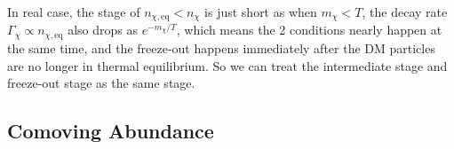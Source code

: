 \bigskip \noindent
\begin{remark}
    In real case, the stage of $n_{\chi,\mathrm{eq}} < n_\chi$ is just short as when $m_\chi < T$, the decay rate $\Gamma_\chi \propto n_{\chi,\mathrm{eq}}$ also drops as $e^{-m_\chi/T}$, which means the 2 conditions nearly happen at the same time, and the freeze-out happens immediately after the DM particles are no longer in thermal equilibrium. So we can treat the intermediate stage and freeze-out stage as the same stage.
\end{remark}

\bigskip \noindent \bigskip \noindent \bigskip \noindent
\subsection{Comoving Abundance}
